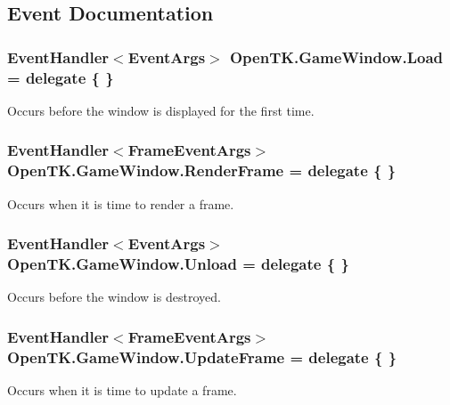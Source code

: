 \subsection{Event Documentation}
\hypertarget{class_open_t_k_1_1_game_window_a5d449a387cf4600251fc534fd49bdbc3}{
\subsubsection[{Load}]{\setlength{\rightskip}{0pt plus 5cm}Event\-Handler$<$Event\-Args$>$ Open\-T\-K.\-Game\-Window.\-Load = delegate \{ \}}}\label{class_open_t_k_1_1_game_window_a5d449a387cf4600251fc534fd49bdbc3}


Occurs before the window is displayed for the first time. 

\hypertarget{class_open_t_k_1_1_game_window_a299211a98496fdac0a526a353dd5f25a}{
\subsubsection[{Render\-Frame}]{\setlength{\rightskip}{0pt plus 5cm}Event\-Handler$<${\bf Frame\-Event\-Args}$>$ Open\-T\-K.\-Game\-Window.\-Render\-Frame = delegate \{ \}}}\label{class_open_t_k_1_1_game_window_a299211a98496fdac0a526a353dd5f25a}


Occurs when it is time to render a frame. 

\hypertarget{class_open_t_k_1_1_game_window_a039f40ed67b4d0c64e292c7e9e77e80b}{
\subsubsection[{Unload}]{\setlength{\rightskip}{0pt plus 5cm}Event\-Handler$<$Event\-Args$>$ Open\-T\-K.\-Game\-Window.\-Unload = delegate \{ \}}}\label{class_open_t_k_1_1_game_window_a039f40ed67b4d0c64e292c7e9e77e80b}


Occurs before the window is destroyed. 

\hypertarget{class_open_t_k_1_1_game_window_af3c171dd667a38eb461df532ff6cc016}{
\subsubsection[{Update\-Frame}]{\setlength{\rightskip}{0pt plus 5cm}Event\-Handler$<${\bf Frame\-Event\-Args}$>$ Open\-T\-K.\-Game\-Window.\-Update\-Frame = delegate \{ \}}}\label{class_open_t_k_1_1_game_window_af3c171dd667a38eb461df532ff6cc016}


Occurs when it is time to update a frame. 

